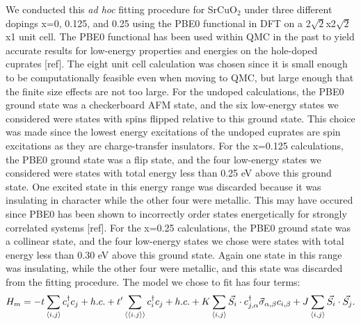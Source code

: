 \documentclass{article}
\begin{document}
We conducted this \textit{ad hoc} fitting procedure for SrCuO$_2$ under three different dopings x=0, 0.125, and 0.25 using the PBE0 functional in DFT on a 2$\sqrt{2}$x2$\sqrt{2}$x1 unit cell. The PBE0 functional has been used within QMC in the past to yield accurate results for low-energy properties and energies on the hole-doped cuprates [ref]. The eight unit cell calculation was chosen since it is small enough to be computationally feasible even when moving to QMC, but large enough that the finite size effects are not too large. For the undoped calculations, the PBE0 ground state was a checkerboard AFM state, and the six low-energy states we considered were states with spins flipped relative to this ground state. This choice was made since the lowest energy excitations of the undoped cuprates are spin excitations as they are charge-transfer insulators. For the x=0.125 calculations, the PBE0 ground state was a flip state, and the four low-energy states we considered were states with total energy less than 0.25 eV above this ground state. One excited state in this energy range was discarded because it was insulating in character while the other four were metallic. This may have occured since PBE0 has been shown to incorrectly order states energetically for strongly correlated systems [ref]. For the x=0.25 calculations, the PBE0 ground state was a collinear state, and the four low-energy states we chose were states with total energy less than 0.30 eV above this ground state. Again one state in this range was insulating, while the other four were metallic, and this state was discarded from the fitting procedure. The model we chose to fit has four terms: 
\begin{equation}
H_m = -t \sum_{\langle i,j \rangle} c_i^\dagger c_j + h.c.
+ t^\prime\sum_{\langle \langle i.j \rangle \rangle} c_i^\dagger c_j + h.c. +\\
K\sum_{\langle i,j \rangle} \vec{S_i} \cdot c_{j,\alpha}^\dagger \vec{\sigma}_{\alpha,\beta} c_{i,\beta} + J \sum_{\langle i,j \rangle} \vec{S_i} \cdot \vec{S_j}.
\end{equation}
\end{document}
